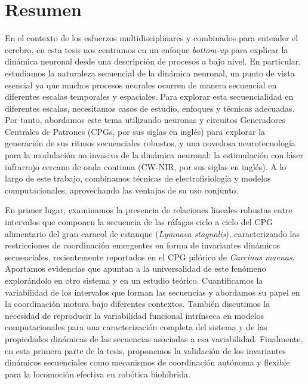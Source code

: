 \chapter*{Resumen}
En el contexto de los esfuerzos multidisciplinares y combinados para entender el cerebro, en esta tesis nos centramos en un enfoque \textit{bottom-up} para explicar la dinámica neuronal desde una descripción de procesos a bajo nivel. En particular, estudiamos la naturaleza secuencial de la dinámica neuronal, un punto de vista esencial ya que muchos procesos neurales ocurren de manera secuencial en diferentes escalas temporales y espaciales. Para explorar esta secuencialidad en diferentes escalas, necesitamos casos de estudio, enfoques y técnicas adecuadas. Por tanto, abordamos este tema utilizando neuronas y circuitos Generadores Centrales de Patrones (CPGs, por sus siglas en inglés) para explorar la generación de sus ritmos secuenciales robustos, y una novedosa neurotecnología para la modulación no invasiva de la dinámica neuronal: la estimulación con láser infrarrojo cercano de onda continua (CW-NIR, por sus siglas en inglés). A lo largo de este trabajo, combinamos técnicas de electrofisiología y modelos computacionales, aprovechando las ventajas de su uso conjunto.

En primer lugar, examinamos la presencia de relaciones lineales robustas entre intervalos que componen la secuencia de las ráfagas ciclo a ciclo del CPG alimentario del gran caracol de estanque (\textit{Lymnaea stagnalis}), caracterizando las restricciones de coordinación emergentes en forma de invariantes dinámicos secuenciales, recientemente reportados en el CPG pilórico de \textit{Carcinus maenas}. Aportamos evidencias que apuntan a la universalidad de este fenómeno explorándolo en otro sistema y en un estudio teórico. Cuantificamos la variabilidad de los intervalos que forman las secuencias y abordamos su papel en la coordinación motora bajo diferentes contextos. También discutimos la necesidad de reproducir la variabilidad funcional intrínseca en modelos computacionales para una caracterización completa del sistema y de las propiedades dinámicas de las secuencias asociadas a esa variabilidad. Finalmente, en esta primera parte de la tesis, proponemos la validación de los invariantes dinámicos secuenciales como mecanismos de coordinación autónoma y flexible para la locomoción efectiva en robótica biohíbrida.

